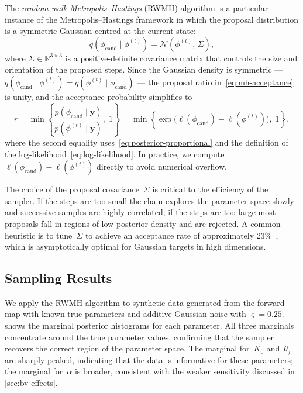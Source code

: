 The \emph{random walk Metropolis--Hastings} (RWMH) algorithm is a
particular instance of the Metropolis--Hastings framework in which the
proposal distribution is a symmetric Gaussian centred at the current
state:
\begin{equation}
  q(\phi_{\mathrm{cand}} \mid \phi^{(t)})
  = \mathcal{N}(\phi^{(t)},\, \Sigma),
  \label{eq:rwmh-proposal}
\end{equation}
where $\Sigma \in \mathbb{R}^{3 \times 3}$ is a positive-definite
covariance matrix that controls the size and orientation of the proposed
steps. Since the Gaussian density is symmetric ---
$q(\phi_{\mathrm{cand}} \mid \phi^{(t)}) = q(\phi^{(t)} \mid
\phi_{\mathrm{cand}})$ --- the proposal ratio
in~\cref{eq:mh-acceptance} is unity, and the acceptance probability
simplifies to
\begin{equation}
  r = \min\!\left\{
    \frac{p(\phi_{\mathrm{cand}} \mid \mathbf{y})}
    {p(\phi^{(t)} \mid \mathbf{y})},\; 1
  \right\}
  = \min\!\left\{
    \exp\!\big(\ell(\phi_{\mathrm{cand}}) - \ell(\phi^{(t)})\big),\; 1
  \right\},
  \label{eq:rwmh-acceptance}
\end{equation}
where the second equality uses~\cref{eq:posterior-proportional} and the
definition of the log-likelihood~\cref{eq:log-likelihood}. In practice,
we compute $\ell(\phi_{\mathrm{cand}}) - \ell(\phi^{(t)})$ directly to
avoid numerical overflow.

The choice of the proposal covariance~$\Sigma$ is critical to the
efficiency of the sampler. If the steps are too small the chain explores
the parameter space slowly and successive samples are highly correlated;
if the steps are too large most proposals fall in regions of low
posterior density and are rejected. A common heuristic is to
tune~$\Sigma$ to achieve an acceptance rate of
approximately $23\%$~\cite{gelman1997weak}, which is asymptotically
optimal for Gaussian targets in high dimensions.

\subsection{Sampling Results}\label{sec:sampling-results}

We apply the RWMH algorithm to synthetic data generated from the forward
map with known true parameters and additive Gaussian noise with
$\varsigma = 0.25$.  shows the marginal posterior
histograms for each parameter. All three marginals concentrate around the
true parameter values, confirming that the sampler recovers the correct
region of the parameter space. The marginal for~$K_0$ and~$\theta_f$ are
sharply peaked, indicating that the data is informative for these
parameters; the marginal for~$\alpha$ is broader, consistent with the
weaker sensitivity discussed in \cref{sec:bv-effects}.

